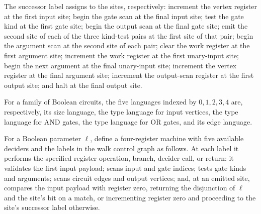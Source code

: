 \begin{definition}
\label{BoolCircuit.AdjWalk.Site.next}
\leanok
{}
The successor label assigns to the sites, respectively: increment the vertex register at
the first input site; begin the gate scan at the final input site; test the gate kind at
the first gate site; begin the output scan at the final gate site; emit the second site
of each of the three kind-test pairs at the first site of that pair; begin the argument
scan at the second site of each pair; clear the work register at the first argument
site; increment the work register at the first unary-input site; begin the next argument
at the final unary-input site; increment the vertex register at the final argument site;
increment the output-scan register at the first output site; and halt at the final
output site.
\end{definition}

\begin{definition}
\label{BoolCircuit.AdjWalk.decs}
\leanok
{}
For a family of Boolean circuits, the five languages indexed by $0,1,2,3,4$ are,
respectively, its size language, the type language for input vertices, the type language
for AND gates, the type language for OR gates, and its edge language.
\end{definition}

\begin{definition}
\label{BoolCircuit.AdjWalk.walk}
\leanok
{}
For a Boolean parameter $\ell$, define a four-register machine with five available
deciders and the labels in the walk control graph as follows. At each label it performs
the specified register operation, branch, decider call, or return: it validates the
first input payload; scans input and gate indices; tests gate kinds and arguments; scans
circuit edges and output vertices; and, at an emitted site, compares the input payload
with register zero, returning the disjunction of $\ell$ and the site's bit on a match,
or incrementing register zero and proceeding to the site's successor label otherwise.
\end{definition}

